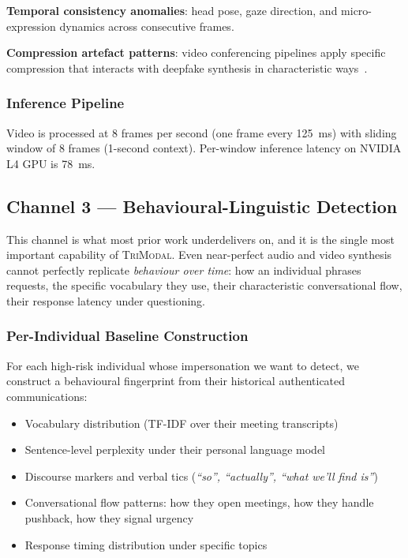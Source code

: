 \documentclass[sigconf,nonacm]{acmart}
\begin{document}
\textbf{Temporal consistency anomalies}: head pose, gaze direction,
and micro-expression dynamics across consecutive frames.

\textbf{Compression artefact patterns}: video conferencing pipelines
apply specific compression that interacts with deepfake synthesis in
characteristic ways~\cite{nguyen2024compression}.

\subsubsection{Inference Pipeline}

Video is processed at 8 frames per second (one frame every 125~ms)
with sliding window of 8 frames (1-second context). Per-window
inference latency on NVIDIA L4 GPU is 78~ms.

\subsection{Channel 3 --- Behavioural-Linguistic Detection}

This channel is what most prior work underdelivers on, and it is the
single most important capability of \textsc{TriModal}. Even
near-perfect audio and video synthesis cannot perfectly replicate
\emph{behaviour over time}: how an individual phrases requests, the
specific vocabulary they use, their characteristic conversational
flow, their response latency under questioning.

\subsubsection{Per-Individual Baseline Construction}

For each high-risk individual whose impersonation we want to detect,
we construct a behavioural fingerprint from their historical
authenticated communications:

\begin{itemize}
  \item Vocabulary distribution (TF-IDF over their meeting transcripts)
  \item Sentence-level perplexity under their personal language model
  \item Discourse markers and verbal tics ({\em ``so'', ``actually'',
        ``what we'll find is''})
  \item Conversational flow patterns: how they open meetings, how
        they handle pushback, how they signal urgency
  \item Response timing distribution under specific topics
\end{itemize}
\end{document}
